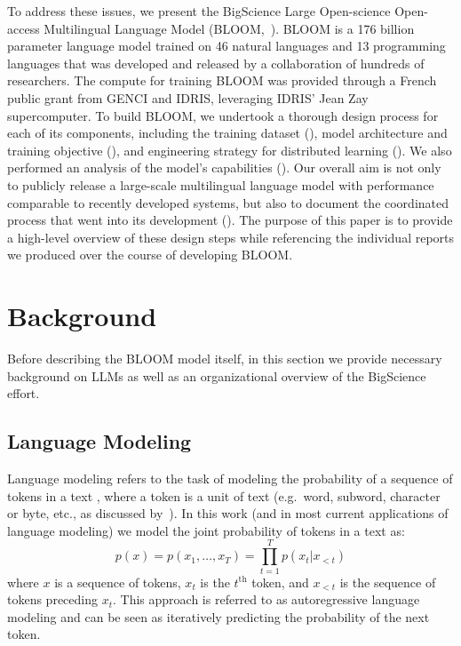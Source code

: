 \documentclass[twoside,11pt]{article}
\begin{document}
To address these issues, we present the BigScience Large Open-science Open-access Multilingual Language Model (BLOOM,~\citealp{bloom_model}).
BLOOM is a 176 billion parameter language model trained on 46 natural languages and 13 programming languages that was developed and released by a collaboration of hundreds of researchers.
The compute for training BLOOM was provided through a French public grant from GENCI and IDRIS, leveraging IDRIS' Jean Zay supercomputer.
To build BLOOM, we undertook a thorough design process for each of its components, including the training dataset (), model architecture and training objective (), and engineering strategy for distributed learning ().
We also performed an analysis of the model's capabilities ().
Our overall aim is not only to publicly release a large-scale multilingual language model with performance comparable to recently developed systems, but also to document the coordinated process that went into its development ().
The purpose of this paper is to provide a high-level overview of these design steps while referencing the individual reports we produced over the course of developing BLOOM.

\section{Background}
\label{sec:background}

Before describing the BLOOM model itself, in this section we provide necessary background on LLMs as well as an organizational overview of the BigScience effort.

\subsection{Language Modeling}
Language modeling refers to the task of modeling the probability of a sequence of tokens in a text \citep{shannon1948mathematical}, where a token is a unit of text (e.g.\ word, subword, character or byte, etc., as discussed by~\citealp{mielke2021between}).
In this work (and in most current applications of language modeling) we model the joint probability of tokens in a text as:
\begin{equation}
    p(x) = p(x_1, \ldots, x_T) = \prod_{t = 1}^T p(x_t | x_{< t})
\end{equation}
where $x$ is a sequence of tokens, $x_t$ is the $t^{\mathrm{th}}$ token, and $x_{< t}$ is the sequence of tokens preceding $x_t$.
This approach is referred to as autoregressive language modeling and can be seen as iteratively predicting the probability of the next token.
\end{document}

